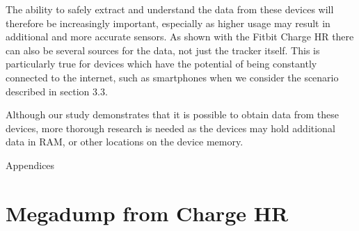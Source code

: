 \documentclass[a4paper,11pt,dvips]{article}
\begin{document}
The ability to safely extract and understand the data from these devices will therefore be increasingly important, especially as higher usage may result in additional and more accurate sensors. As shown with the Fitbit Charge HR there can also be several sources for the data, not just the tracker itself. This is particularly true for devices which have the potential of being constantly connected to the internet, such as smartphones when we consider the scenario described in section 3.3.  

Although our study demonstrates that it is possible to obtain data from these devices, more thorough research is needed as the devices may hold additional data in RAM, or other locations on the device memory. 




\newpage
\appendix
\noindent
\Huge{Appendices}
\normalsize
\section{Megadump from Charge HR}\label{app:megadump}
\end{document}
